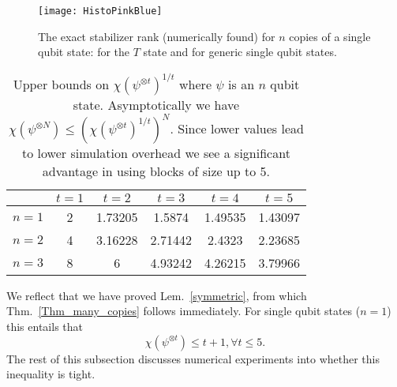 \begin{figure}
	\centering
	\texttt{[image: HistoPinkBlue]}
	\caption{The exact stabilizer rank (numerically found) for $n$ copies of a single qubit state: for the $T$ state and for generic single qubit states.}
	\label{SingleQubitStates}
\end{figure}

\begin{table}

\centering

	\begin{tabular}{|c||ccccc|} 	  \hline
		&	$t=1$ &  $t=2$ &  $t=3$ & $t=4$ & $t=5$ \\  \hline  \hline
		$n=1$  &	2 &  1.73205 &  1.5874 & 1.49535 & 1.43097 \\ 
		$n=2$  &  4 &  3.16228 & 2.71442 & 2.4323 & 2.23685 \\
		$n=3$ &   8 &  6           & 4.93242 & 4.26215&  3.79966 \\   \hline
	\end{tabular}	
	\caption{Upper bounds on $\chi(\psi^{\otimes t})^{1/t}$ where $\psi$ is an $n$ qubit state.  Asymptotically we have $\chi(\psi^{\otimes N}) \leq (\chi(\psi^{\otimes t})^{1/t})^N$.  Since lower values lead to lower simulation overhead we see a significant advantage in using blocks of size up to 5.} 	\label{Tab_Numbers}
\end{table}

We reflect that we have proved Lem.~\ref{symmetric}, from which Thm.~\ref{Thm_many_copies} follows immediately.  For single qubit states ($n=1$) this entails that 
\begin{equation}
		\chi( \psi^{\otimes t}) \leq t + 1 , \forall t \leq 5 \label{EqOneQubit} .
\end{equation}	 
The rest of this subsection discusses numerical experiments into whether this inequality is tight.


